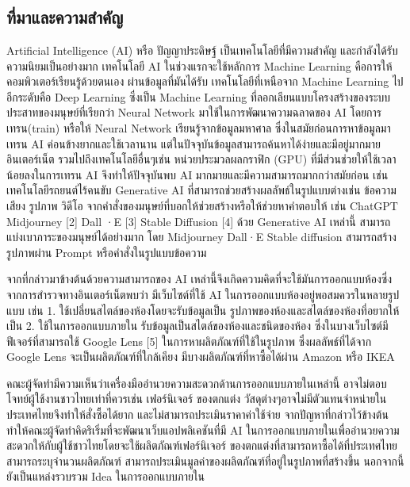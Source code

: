 \documentclass[12pt,oneside,openright,a4paper]{cpe-thai-project}
\begin{document}



\chapter{}

\section{ที่มาและความสำคัญ}
\hspace {18pt}Artificial Intelligence (AI) หรือ ปัญญาประดิษฐ์ เป็นเทคโนโลยีที่มีความสำคัญ และกำลังได้รับความนิยมเป็นอย่างมาก เทคโนโลยี AI ในช่วงแรกจะใช้หลักการ Machine Learning คือการให้คอมพิวเตอร์เรียนรู้ด้วยตนเอง ผ่านข้อมูลที่มันได้รับ เทคโนโลยีที่เหนือจาก Machine Learning ไปอีกระดับคือ Deep Learning  ซึ่งเป็น Machine Learning ที่ลอกเลียนแบบโครงสร้างของระบบประสาทของมนุษย์ที่เรียกว่า Neural Network มาใช้ในการพัฒนาความฉลาดของ AI โดยการเทรน(train) หรือให้ Neural Network เรียนรู้จากข้อมูลมหาศาล ซึ่งในสมัยก่อนการหาข้อมูลมาเทรน AI ค่อนข้างยากและใช้เวลานาน แต่ในปัจจุบันข้อมูลสามารถค้นหาได้ง่ายและมีอยู่มากมายอินเตอร์เน็ต รวมไปถึงเทคโนโลยีอื่นๆเช่น หน่วยประมวลผลกราฟิก (GPU) ที่มีส่วนช่วยให้ใช้เวลาน้อยลงในการเทรน AI จึงทำให้ปัจจุบันพบ AI มากมายและมีความสามารถมากกว่าสมัยก่อน เช่น เทคโนโลยีรถยนต์ไร้คนขับ Generative AI ที่สามารถช่วยสร้างผลลัพธ์ในรูปแบบต่างเช่น ข้อความ เสียง รูปภาพ วิดีโอ จากคำสั่งของมนุษย์ที่บอกให้ช่วยสร้างหรือให้ช่วยหาคำตอบให้ เช่น ChatGPT \cite{chatgpt} Midjourney [2] Dall ·E [3] Stable Diffusion [4] ด้วย Generative AI เหล่านี้ สามารถแบ่งเบาภาระของมนุษย์ได้อย่างมาก โดย Midjourney Dall·E Stable diffusion สามารถสร้างรูปภาพผ่าน Prompt หรือคำสั่งในรูปแบบข้อความ
 \par \hspace {18pt} 
จากที่กล่าวมาข้างต้นด้วยความสามารถของ AI เหล่านี้จึงเกิดความคิดที่จะใช้มันการออกแบบห้องซึ่งจากการสำรวจทางอินเตอร์เน็ตพบว่า มีเว็บไซต์ที่ใช้ AI ในการออกแบบห้องอยู่พอสมควรในหลายรูปแบบ เช่น 1. ใช้เปลี่ยนสไตล์ของห้องโดยจะรับข้อมูลเป็น รูปภาพของห้องและสไตล์ของห้องที่อยากให้เป็น 2. ใช้ในการออกแบบภายใน รับข้อมูลเป็นสไตล์ของห้องและชนิดของห้อง ซึ่งในบางเว็บไซต์มีฟีเจอร์ที่สามารถใช้ Google Lens [5] ในการหาผลิตภัณฑ์ที่ใช้ในรูปภาพ ซึ่งผลลัพธ์ที่ได้จาก Google Lens จะเป็นผลิตภัณฑ์ที่ใกล้เคียง มีบางผลิตภัณฑ์ที่หาซื้อได้ผ่าน Amazon หรือ IKEA
\par  \hspace {18pt}
คณะผู้จัดทำมีความเห็นว่าเครื่องมืออำนวยความสะดวกด้านการออกแบบภายในเหล่านี้ อาจไม่ตอบโจทย์ผู้ใช้งานชาวไทยเท่าที่ควรเช่น เฟอร์นิเจอร์ ของตกแต่ง วัสดุต่างๆอาจไม่มีตัวแทนจำหน่ายในประเทศไทยจึงทำให้สั่งซื้อได้ยาก และไม่สามารถประเมินราคาค่าใช้จ่าย จากปัญหาที่กล่าวไว้ข้างต้นทำให้คณะผู้จัดทำคิดริเริ่มที่จะพัฒนาเว็บแอปพลิเคชันที่มี AI ในการออกแบบภายในเพื่ออำนวยความสะดวกให้กับผู้ใช้ชาวไทยโดยจะใช้ผลิตภัณฑ์เฟอร์นิเจอร์ ของตกแต่งที่สามารถหาซื้อได้ที่ประเทศไทย สามารถระบุจำนวนผลิตภัณฑ์ สามารถประเมินมูลค่าของผลิตภัณฑ์ที่อยู่ในรูปภาพที่สร้างขึ้น นอกจากนี้ยังเป็นแหล่งรวบรวม Idea ในการออกแบบภายใน
\end{document}
